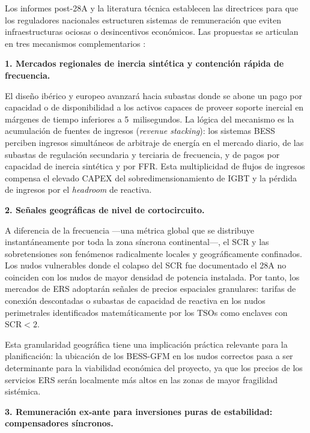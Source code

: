 Los informes post-28A y la literatura técnica establecen las directrices
para que los reguladores nacionales estructuren sistemas de remuneración
que eviten infraestructuras ociosas o desincentivos económicos. Las
propuestas se articulan en tres mecanismos complementarios
\cite{entsoe2025,gobierno2025}:

\vspace{0.3cm}
\noindent\textbf{1. Mercados regionales de inercia sintética y
contención rápida de frecuencia.}

El diseño ibérico y europeo avanzará hacia subastas donde se abone un
pago por capacidad o de disponibilidad a los activos capaces de proveer
soporte inercial en márgenes de tiempo inferiores a 5~milisegundos. La
lógica del mecanismo es la acumulación de fuentes de ingresos
(\textit{revenue stacking}): los sistemas BESS perciben ingresos
simultáneos de arbitraje de energía en el mercado diario, de las subastas
de regulación secundaria y terciaria de frecuencia, y de pagos por
capacidad de inercia sintética y por FFR. Esta multiplicidad de flujos
de ingresos compensa el elevado CAPEX del sobredimensionamiento de IGBT
y la pérdida de ingresos por el \textit{headroom} de reactiva.

\vspace{0.3cm}
\noindent\textbf{2. Señales geográficas de nivel de cortocircuito.}

A diferencia de la frecuencia ---una métrica global que se distribuye
instantáneamente por toda la zona síncrona continental---, el SCR y
las sobretensiones son fenómenos radicalmente locales y geográficamente
confinados. Los nudos vulnerables donde el colapso del SCR fue
documentado el 28A no coinciden con los nudos de mayor densidad de
potencia instalada. Por tanto, los mercados de ERS adoptarán señales de
precios espaciales granulares: tarifas de conexión descontadas o subastas
de capacidad de reactiva en los nudos perimetrales identificados
matemáticamente por los TSOs como enclaves con $\mathrm{SCR} < 2$.

Esta granularidad geográfica tiene una implicación práctica relevante
para la planificación: la ubicación de los BESS-GFM en los nudos correctos
pasa a ser determinante para la viabilidad económica del proyecto, ya que
los precios de los servicios ERS serán localmente más altos en las zonas
de mayor fragilidad sistémica.

\vspace{0.3cm}
\noindent\textbf{3. Remuneración ex-ante para inversiones puras de
estabilidad: compensadores síncronos.}

